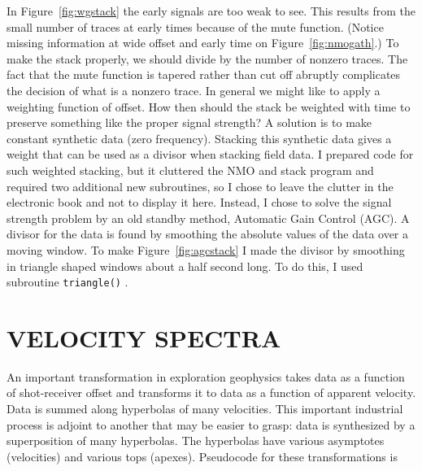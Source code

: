 In Figure~\ref{fig:wgstack} the early signals are too weak to see.
This results from the small number of traces
at early times because of the mute function.
(Notice missing information at wide offset and early time
on Figure~\ref{fig:nmogath}.)
To make the stack properly, we should divide by the number of nonzero traces.
The fact that the mute function is tapered rather than cut off abruptly
complicates the decision of what is a nonzero trace.
In general we might like to apply a weighting function of offset.
How then should the stack be weighted with time to preserve
something like the proper signal strength?
A solution is to make constant synthetic data (zero frequency).
Stacking this synthetic data gives a weight that can be used
as a divisor when stacking field data.
I prepared code for such weighted stacking,
but it cluttered the NMO and stack program and required
two additional new subroutines,
so I chose to leave the clutter in the electronic book
and not to display it here.
Instead, I chose to solve the signal strength problem
by an old standby method, Automatic Gain Control (AGC).
A divisor for the data is found by smoothing the absolute
values of the data over a moving window.
To make Figure~\ref{fig:agcstack} I made the divisor by smoothing
in triangle shaped windows about a half second long.
To do this, I used subroutine \texttt{triangle()} .


%
%
%

\section{VELOCITY SPECTRA}
An important transformation in exploration geophysics
takes data as a function of shot-receiver offset
and transforms it to data as a function of apparent velocity.
Data is summed along hyperbolas of many velocities.
This important industrial process is adjoint to another that may
be easier to grasp:  data is synthesized by a superposition
of many hyperbolas.
The hyperbolas have various asymptotes (velocities) and various
tops (apexes).
Pseudocode for these transformations is
\par\noindent

